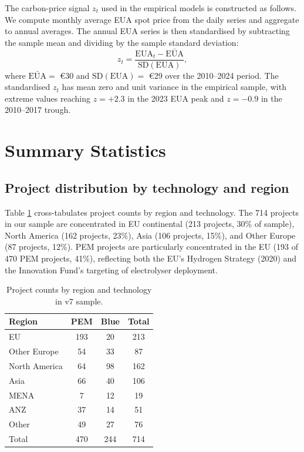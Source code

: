 \documentclass[11pt,a4paper]{article}
\begin{document}
The carbon-price signal $z_t$ used in the empirical models is constructed as follows. We compute monthly average EUA spot price from the daily series and aggregate to annual averages. The annual EUA series is then standardised by subtracting the sample mean and dividing by the sample standard deviation:
\begin{equation}
z_t = \frac{\mathrm{EUA}_t - \bar{\mathrm{EUA}}}{\mathrm{SD}(\mathrm{EUA})},
\end{equation}
where $\bar{\mathrm{EUA}} = $ \euro 30 and $\mathrm{SD}(\mathrm{EUA}) = $ \euro 29 over the 2010--2024 period. The standardised $z_t$ has mean zero and unit variance in the empirical sample, with extreme values reaching $z = +2.3$ in the 2023 EUA peak and $z = -0.9$ in the 2010--2017 trough.

\section{Summary Statistics}
\label{sec:ch4-summary}

\subsection{Project distribution by technology and region}

Table \ref{tab:ch4-region-tech} cross-tabulates project counts by region and technology. The 714 projects in our sample are concentrated in EU continental (213 projects, 30\% of sample), North America (162 projects, 23\%), Asia (106 projects, 15\%), and Other Europe (87 projects, 12\%). PEM projects are particularly concentrated in the EU (193 of 470 PEM projects, 41\%), reflecting both the EU's Hydrogen Strategy (2020) and the Innovation Fund's targeting of electrolyser deployment.

\begin{table}[h!]
\centering
\caption{Project counts by region and technology in v7 sample.}
\begin{tabular}{lccc}
\toprule
Region & PEM & Blue & Total \\
\midrule
EU                  & 193 &  20 & 213 \\
Other Europe        &  54 &  33 &  87 \\
North America       &  64 &  98 & 162 \\
Asia                &  66 &  40 & 106 \\
MENA                &   7 &  12 &  19 \\
ANZ                 &  37 &  14 &  51 \\
Other               &  49 &  27 &  76 \\
\midrule
Total               & 470 & 244 & 714 \\
\bottomrule
\end{tabular}
\label{tab:ch4-region-tech}
\end{table}
\end{document}
